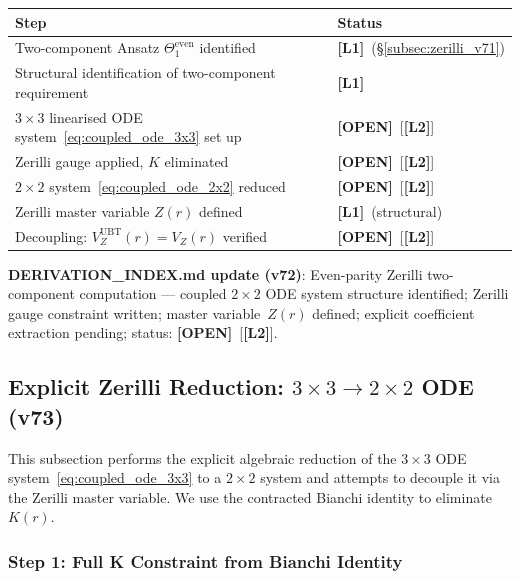 \documentclass[12pt]{article}
\theoremstyle{definition}
\theoremstyle{remark}
\newcommand{\Lone}{\textbf{[L1]}}
\newcommand{\Ltwo}{\textbf{[L2]}}
\newcommand{\OPEN}{\textbf{[OPEN]}}
\begin{document}
\begin{center}
\begin{tabular}{|l|l|}
\hline
\textbf{Step} & \textbf{Status} \\
\hline
Two-component Ansatz $\Theta_1^{\text{even}}$ identified & \Lone\ (§\ref{subsec:zerilli_v71}) \\
Structural identification of two-component requirement & \Lone\ \\
$3\times3$ linearised ODE system~\eqref{eq:coupled_ode_3x3} set up & \OPEN\ [\Ltwo] \\
Zerilli gauge applied, $K$ eliminated & \OPEN\ [\Ltwo] \\
$2\times2$ system~\eqref{eq:coupled_ode_2x2} reduced & \OPEN\ [\Ltwo] \\
Zerilli master variable $Z(r)$ defined & \Lone\ (structural) \\
Decoupling: $V_Z^{\text{UBT}}(r) = V_Z(r)$ verified & \OPEN\ [\Ltwo] \\
\hline
\end{tabular}
\end{center}

\medskip
\noindent\textbf{DERIVATION\_INDEX.md update (v72)}: Even-parity Zerilli
two-component computation — coupled $2\times2$ ODE system structure
identified; Zerilli gauge constraint written; master variable~$Z(r)$
defined; explicit coefficient extraction pending; status: \OPEN\ [\Ltwo].

\subsection{Explicit Zerilli Reduction: $3\times3 \to 2\times2$ ODE (v73)}
\label{subsec:zerilli_reduction_v73}

This subsection performs the explicit algebraic reduction of the $3\times 3$
ODE system~\eqref{eq:coupled_ode_3x3} to a $2\times 2$ system and attempts to
decouple it via the Zerilli master variable.  We use the contracted Bianchi
identity to eliminate $K(r)$.

\subsubsection{Step 1: Full K Constraint from Bianchi Identity}
\end{document}
